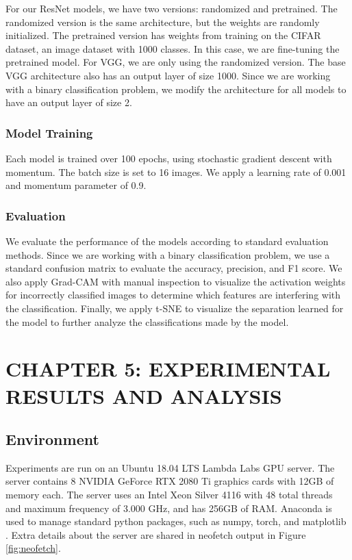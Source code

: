 \documentclass[12pt]{article}
\begin{document}
For our ResNet models, we have two versions: randomized and pretrained. The
randomized version is the same architecture, but the weights are randomly
initialized. The pretrained version has weights from training on the CIFAR
dataset, an image dataset with 1000 classes. In this case, we are fine-tuning
the pretrained model. For VGG, we are only using the randomized version. The
base VGG architecture also has an output layer of size 1000. Since we are
working with a binary classification problem, we modify the architecture for all
models to have an output layer of size 2.

\subsubsection{Model Training}

Each model is trained over 100 epochs, using stochastic gradient descent with
momentum. The batch size is set to 16 images. We apply a learning rate of 0.001
and momentum parameter of 0.9.

\subsubsection{Evaluation}

We evaluate the performance of the models according to standard evaluation
methods. Since we are working with a binary classification problem, we use a
standard confusion matrix to evaluate the accuracy, precision, and F1 score. We
also apply Grad-CAM with manual inspection to visualize the activation weights
for incorrectly classified images to determine which features are interfering
with the classification. Finally, we apply t-SNE to visualize the separation
learned for the model to further analyze the classifications made by the model.

\newpage
\section{CHAPTER 5: EXPERIMENTAL RESULTS AND ANALYSIS}

\subsection{Environment}

Experiments are run on an Ubuntu 18.04 LTS Lambda Labs GPU server. The server
contains 8 NVIDIA GeForce RTX 2080 Ti graphics cards with 12GB of memory each.
The server uses an Intel Xeon Silver 4116 with 48 total threads and maximum
frequency of 3.000 GHz, and has 256GB of RAM. Anaconda is used to manage
standard python packages, such as numpy, torch, and matplotlib \cite{anaconda,
    harris_array_2020, paszke_pytorch_2019, hunter_matplotlib_2007}. Extra details
about the server are shared in neofetch output in Figure \ref{fig:neofetch}.
\end{document}
